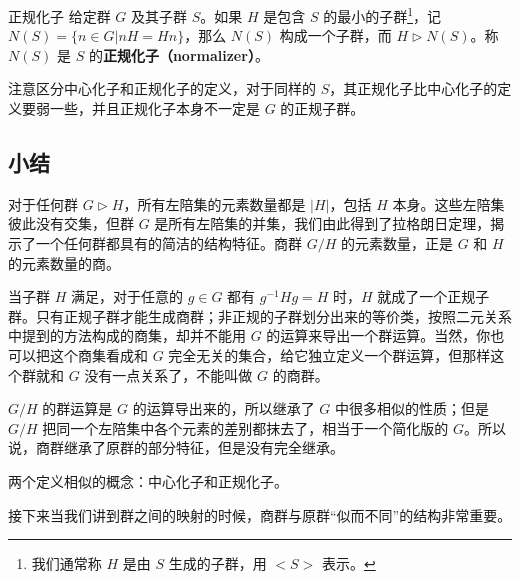 \begin{definition}{正规化子}\label{def_NormSG_2}
给定群 $G$ 及其子群 $S$。如果 $H$ 是包含 $S$ 的最小的子群\footnote{我们通常称 $H$ 是由 $S$ 生成的子群，用 $<S>$ 表示。}，记 $N(S)=\{n\in G|nH=Hn\}$，那么 $N(S)$ 构成一个子群，而 $H\vartriangleright N(S)$。称 $N(S)$ 是 $S$ 的\textbf{正规化子（normalizer）}。
\end{definition}

注意区分中心化子和正规化子的定义，对于同样的 $S$，其正规化子比中心化子的定义要弱一些，并且正规化子本身不一定是 $G$ 的正规子群。

\subsection{小结}

对于任何群 $G\vartriangleright H$，所有左陪集的元素数量都是 $|H|$，包括 $H$ 本身。这些左陪集彼此没有交集，但群 $G$ 是所有左陪集的并集，我们由此得到了拉格朗日定理，揭示了一个任何群都具有的简洁的结构特征。商群 $G/H$ 的元素数量，正是 $G$ 和 $H$ 的元素数量的商。

当子群 $H$ 满足，对于任意的 $g\in G$ 都有 $g^{-1}Hg=H$ 时，$H$ 就成了一个正规子群。只有正规子群才能生成商群；非正规的子群划分出来的等价类，按照二元关系中提到的方法构成的商集，却并不能用 $G$ 的运算来导出一个群运算。当然，你也可以把这个商集看成和 $G$ 完全无关的集合，给它独立定义一个群运算，但那样这个群就和 $G$ 没有一点关系了，不能叫做 $G$ 的商群。

$G/H$ 的群运算是 $G$ 的运算导出来的，所以继承了 $G$ 中很多相似的性质；但是 $G/H$ 把同一个左陪集中各个元素的差别都抹去了，相当于一个简化版的 $G$。所以说，商群继承了原群的部分特征，但是没有完全继承。

两个定义相似的概念：中心化子和正规化子。

接下来当我们讲到群之间的映射的时候，商群与原群“似而不同”的结构非常重要。
